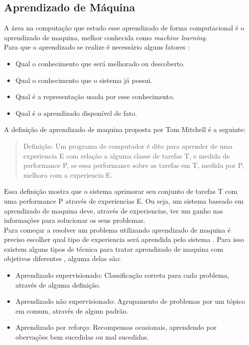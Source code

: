 \subsection{Aprendizado de Máquina} 

A área na computação que estudo esse aprendizado de forma computacional é o aprendizado de maquina, melhor conhecida como \textit{machine learning}. \\

Para que o aprendizado se realize é necessário alguns fatores \cite{intelligence2003modern}:
\begin{itemize}
	\item Qual o conhecimento que será melhorado ou descoberto.
	\item Qual o conhecimento que o sistema já possui.
	\item Qual é a representação usada por esse conhecimento.
	\item Qual é o aprendizado disponível de fato.
\end{itemize}

A definição de aprendizado de maquina proposta por Tom Mitchell \cite{Mitchell1997ML} é a seguinte:

 \begin{quote}
 	Definição: Um programa de computador é dito para aprender de uma experiencia E com relação a alguma classe de tarefas T, e medida de performance P, se essa performance sobre as tarefas em T, medida por P, melhora com a experiencia E.
 \end{quote}

Essa definição mostra que o sistema aprimorar seu conjunto de tarefas T com uma performance P através de experiencias E. Ou seja, um sistema baseado em aprendizado de maquina deve, através de experiencias, ter um ganho nas informações para solucionar os seus problemas.  \\

Para começar a resolver um problema utilizando aprendizado de maquina é preciso escolher qual tipo de experiencia será aprendida pelo sistema \cite{Mitchell1997ML}. Para isso existem alguns tipos de técnica para tratar aprendizado de maquina com objetivos diferentes \cite{intelligence2003modern}, alguma delas são:

\begin{itemize}
	\item Aprendizado supervisionado: Classificação correta para cada problema, através de alguma definição. 
	\item Aprendizado não supervisionado: Agrupamento de problemas por um tópico em comum, através de algum padrão.
	\item Aprendizado por reforço: Recompensas ocasionais, aprendendo por obervações bem sucedidas ou mal sucedidas. 
\end{itemize}

